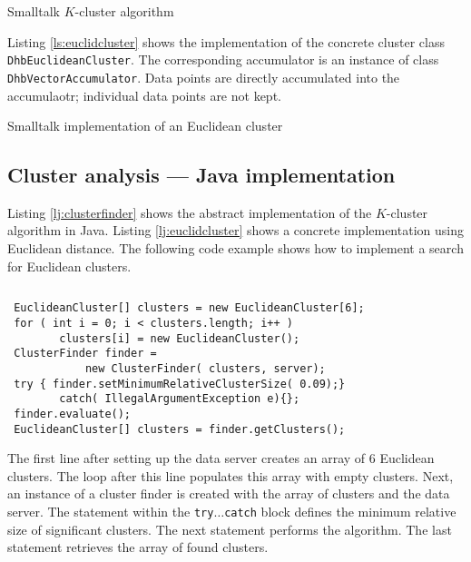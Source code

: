 \documentclass[twoside]{book}
\begin{document}
\begin{listing} Smalltalk $K$-cluster algorithm \label{ls:clusterfinder}


\end{listing}
Listing \ref{ls:euclidcluster} shows the implementation of the
concrete cluster class {\tt DhbEuclideanCluster}. The
corresponding accumulator is an instance of class {\tt
DhbVectorAccumulator}. Data points are directly accumulated into
the accumulaotr; individual data points are not kept.
\begin{listing} Smalltalk implementation of an Euclidean cluster \label{ls:euclidcluster}

\end{listing}

\subsection{Cluster analysis --- Java implementation}
Listing \ref{lj:clusterfinder} shows the abstract implementation
of the $K$-cluster algorithm in Java. Listing
\ref{lj:euclidcluster} shows a concrete implementation using
Euclidean distance. The following code example shows how to
implement a search for Euclidean clusters.
\begin{codeExample}
\begin{verbatim}

\end{verbatim}
\begin{verbatim}
 EuclideanCluster[] clusters = new EuclideanCluster[6];
 for ( int i = 0; i < clusters.length; i++ )
        clusters[i] = new EuclideanCluster();
 ClusterFinder finder =
            new ClusterFinder( clusters, server);
 try { finder.setMinimumRelativeClusterSize( 0.09);}
        catch( IllegalArgumentException e){};
 finder.evaluate();
 EuclideanCluster[] clusters = finder.getClusters();
\end{verbatim}
\end{codeExample}
The first line after setting up the data server creates an array
of 6 Euclidean clusters. The loop after this line populates this
array with empty clusters. Next, an instance of a cluster finder
is created with the array of clusters and the data server. The
statement within the {\tt try$\ldots$catch} block defines the
minimum relative size of significant clusters. The next statement
performs the algorithm. The last statement retrieves the array of
found clusters.
\end{document}
